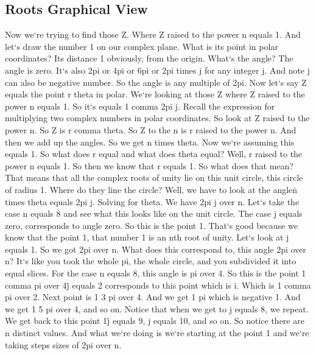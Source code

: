 \subsection{Roots  Graphical View}
Now we`re trying to find those Z\@.
Where Z raised to the power n equals 1.
And let`s draw the number 1 on our complex plane.
What is its point in polar coordinates? Its distance 1 obviously, from the origin.
What`s the angle? The angle is zero.
It`s also 2pi or 4pi or 6pi or 2pi times j for any integer j.
And note j can also be negative number.
So the angle is any multiple of 2pi.
Now let`s say Z equals the point r theta in polar.
We`re looking at those Z where Z raised to the power n equals 1.
So it`s equals 1 comma 2pi j.
Recall the expression for multiplying two complex numbers in polar coordinates.
So look at Z raised to the power n.
So Z is r comma theta.
So Z to the n is r raised to the power n.
And then we add up the angles.
So we get n times theta.
Now we`re assuming this equals 1.
So what does r equal and what does theta equal? Well, r raised to the power n equals 1.
So then we know that r equals 1.
So what does that mean? That means that all the complex roots of unity lie on this unit circle, this circle of radius 1.
Where do they line the circle? Well, we have to look at the angle\. n times theta equals 2pi j.
Solving for theta.
We have 2pi j over n.
Let`s take the case n equals 8 and see what this looks like on the unit circle.
The case j equals zero, corresponds to angle zero.
So this is the point 1.
That`s good because we know that the point 1, that number 1 is an nth root of unity.
Let`s look at j equals 1.
So we got 2pi over n.
What does this correspond to, this angle 2pi over n? It`s like you took the whole pi, the whole circle, and you subdivided it into equal slices.
For the case n equals 8, this angle is pi over 4.
So this is the point 1 comma pi over 4\. j equals 2 corresponds to this point which is i.
Which is 1 comma pi over 2.
Next point is 1 3 pi over 4.
And we get 1 pi which is negative 1.
And we get 1 5 pi over 4, and so on.
Notice that when we get to j equals 8, we repeat.
We get back to this point 1\. j equals 9, j equals 10, and so on.
So notice there are n distinct values.
And what we`re doing is we`re starting at the point 1 and we`re taking steps sizes of 2pi over n.

